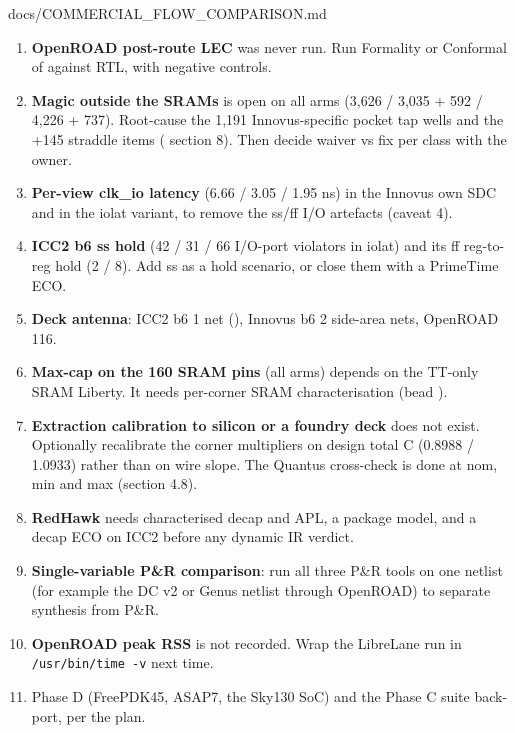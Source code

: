 \begin{relocated}{docs/COMMERCIAL_FLOW_COMPARISON.md}
\begin{enumerate}
\def\labelenumi{\arabic{enumi}.}
\tightlist
\item
  \textbf{OpenROAD post-route LEC} was never run. Run Formality or
  Conformal of   against
  RTL, with negative controls.
\item
  \textbf{Magic  outside the SRAMs} is open on all arms
  (3,626 / 3,035 + 592 / 4,226 + 737). Root-cause the 1,191
  Innovus-specific pocket tap wells and the +145 straddle items
  ( section 8). Then decide waiver vs
  fix per class with the owner.
\item
  \textbf{Per-view clk\_io latency} (6.66 / 3.05 / 1.95 ns) in the
  Innovus own SDC and in the iolat variant, to remove the ss/ff I/O
  artefacts (caveat 4).
\item
  \textbf{ICC2 b6 ss hold} (42 / 31 / 66 I/O-port violators in iolat)
  and its ff reg-to-reg hold (2 / 8). Add ss as a hold scenario, or
  close them with a PrimeTime ECO.
\item
  \textbf{Deck antenna}: ICC2 b6 1 net (),
  Innovus b6 2 side-area nets, OpenROAD 116.
\item
  \textbf{Max-cap on the 160 SRAM  pins} (all arms) depends
  on the TT-only SRAM Liberty. It needs per-corner SRAM characterisation
  (bead ).
\item
  \textbf{Extraction calibration to silicon or a foundry deck} does not
  exist. Optionally recalibrate the corner multipliers on design total C
  (0.8988 / 1.0933) rather than on wire slope. The Quantus cross-check
  is done at nom, min and max (section 4.8).
\item
  \textbf{RedHawk} needs characterised decap and APL, a package model,
  and a decap ECO on ICC2 before any dynamic IR verdict.
\item
  \textbf{Single-variable P\&R comparison}: run all three P\&R tools on
  one netlist (for example the DC v2 or Genus netlist through OpenROAD)
  to separate synthesis from P\&R.
\item
  \textbf{OpenROAD peak RSS} is not recorded. Wrap the LibreLane run in
  \texttt{/\allowbreak{}usr/\allowbreak{}bin/\allowbreak{}time\ -\allowbreak{}v}
  next time.
\item
  Phase D (FreePDK45, ASAP7, the Sky130 SoC) and the Phase C suite
  back-port, per the plan.
\end{enumerate}


\end{relocated}
